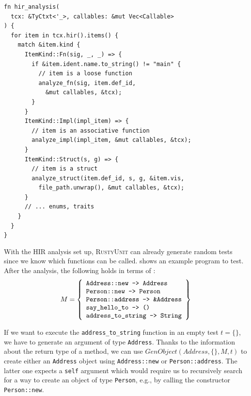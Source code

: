 \documentclass[paper=a4,%
  twoside,%
  BCOR4mm,%
  abstract=true,%
  toc=bibliography,%
  chapterprefix=true,%
  toc=bibliographynumbered,%
  open=right,%
  english,%
  pagesize=pdftex]{scrreprt}
\newcommand{\tech}{\textsc{RustyUnit}\xspace}
\newcommand{\hir}{\ac{HIR}\xspace}
\begin{document}
\begin{lstlisting}[style=boxed, caption={Iterate over the items in the \hir of a crate}, label=lst:hir-analysis]
fn hir_analysis(
  tcx: &TyCtxt<'_>, callables: &mut Vec<Callable>
) {
  for item in tcx.hir().items() {
    match &item.kind {
      ItemKind::Fn(sig, _, _) => {
        if &item.ident.name.to_string() != "main" {
          // item is a loose function
          analyze_fn(sig, item.def_id,
            &mut callables, &tcx);
        }
      }
      ItemKind::Impl(impl_item) => {
        // item is an associative function
        analyze_impl(impl_item, &mut callables, &tcx);
      }
      ItemKind::Struct(s, g) => {
        // item is a struct
        analyze_struct(item.def_id, s, g, &item.vis,
          file_path.unwrap(), &mut callables, &tcx);
      }
      // ... enums, traits
    }
  }
}
\end{lstlisting}

With the \hir analysis set up, \tech can already generate random tests since we know which functions can be called.  shows an example program to test. After the analysis, the following holds in terms of :
\[M = \left\{
  \begin{array}{l}
    \texttt{Address::new -> Address} \\
    \texttt{Person::new -> Person} \\
    \texttt{Person::address -> \&Address} \\
    \texttt{say\string_hello\string_to -> ()} \\
    \texttt{address\string_to\string_string -> String}
  \end{array}
\right\}\]

If we want to execute the \texttt{address\string_to\string_string} function in an empty test $t = \{\}$, we have to generate an argument of type \texttt{Address}. Thanks to the information about the return type of a method, we can use \sloppy$GenObject(Address, \{\}, M, t)$ to create either an \texttt{Address} object using \texttt{Address::new} or \texttt{Person::address}. The latter one expects a \texttt{self} argument which would require us to recursively search for a way to create an object of type \texttt{Person}, e.g., by calling the constructor \texttt{Person::new}.
\end{document}
